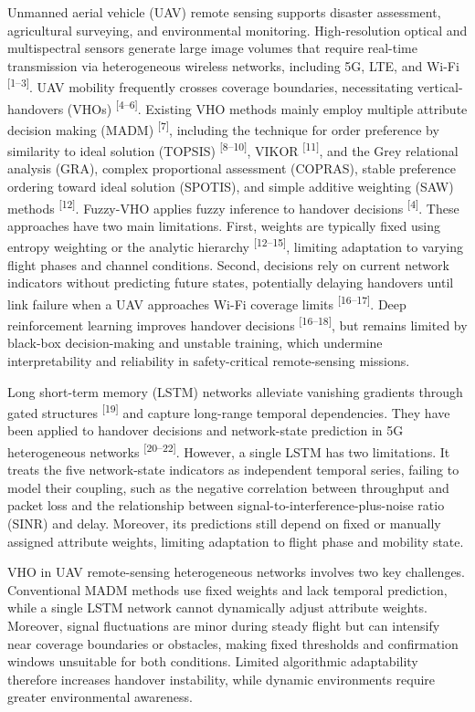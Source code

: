 \documentclass[10pt,a4paper]{article}
\newcommand{\upcite}[1]{\textsuperscript{[#1]}}
\begin{document}
Unmanned aerial vehicle (UAV) remote sensing supports disaster assessment, agricultural surveying, and environmental monitoring. High-resolution optical and multispectral sensors generate large image volumes that require real-time transmission via heterogeneous wireless networks, including 5G, LTE, and Wi-Fi \upcite{1--3}. UAV mobility frequently crosses coverage boundaries, necessitating vertical-handovers (VHOs) \upcite{4--6}. Existing VHO methods mainly employ multiple attribute decision making (MADM) \upcite{7}, including the technique for order preference by similarity to ideal solution (TOPSIS) \upcite{8--10}, VIKOR \upcite{11}, and the Grey relational analysis (GRA), complex proportional assessment (COPRAS), stable preference ordering toward ideal solution (SPOTIS), and simple additive weighting (SAW) methods \upcite{12}. Fuzzy-VHO applies fuzzy inference to handover decisions \upcite{4}. These approaches have two main limitations. First, weights are typically fixed using entropy weighting or the analytic hierarchy \upcite{12--15}, limiting adaptation to varying flight phases and channel conditions. Second, decisions rely on current network indicators without predicting future states, potentially delaying handovers until link failure when a UAV approaches Wi-Fi coverage limits \upcite{16--17}. Deep reinforcement learning improves handover decisions \upcite{16--18}, but remains limited by black-box decision-making and unstable training, which undermine interpretability and reliability in safety-critical remote-sensing missions.

Long short-term memory (LSTM) networks alleviate vanishing gradients through gated structures \upcite{19} and capture long-range temporal dependencies. They have been applied to handover decisions and network-state prediction in 5G heterogeneous networks \upcite{20--22}. However, a single LSTM has two limitations. It treats the five network-state indicators as independent temporal series, failing to model their coupling, such as the negative correlation between throughput and packet loss and the relationship between signal-to-interference-plus-noise ratio (SINR) and delay. Moreover, its predictions still depend on fixed or manually assigned attribute weights, limiting adaptation to flight phase and mobility state.

VHO in UAV remote-sensing heterogeneous networks involves two key challenges. Conventional MADM methods use fixed weights and lack temporal prediction, while a single LSTM network cannot dynamically adjust attribute weights. Moreover, signal fluctuations are minor during steady flight but can intensify near coverage boundaries or obstacles, making fixed thresholds and confirmation windows unsuitable for both conditions. Limited algorithmic adaptability therefore increases handover instability, while dynamic environments require greater environmental awareness.
\end{document}
